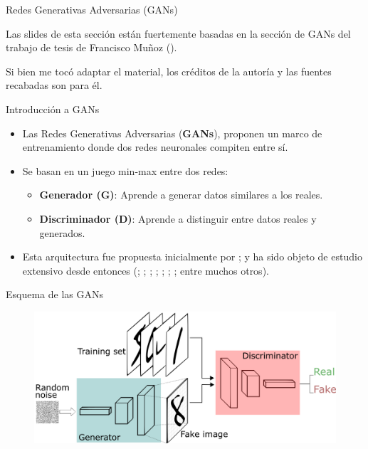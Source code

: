 \documentclass[aspectratio=169,xcolor=dvipsnames, t, spanish]{beamer}
\begin{document}

\begin{frame}{Redes Generativas Adversarias (GANs)}
    \begin{center}
        Las slides de esta sección están fuertemente basadas en la sección de GANs del trabajo de tesis de Francisco Muñoz (\cite{MunozLopez2024}).

        Si bien me tocó adaptar el material, los créditos de la autoría y las fuentes recabadas son para él.
    \end{center}
\end{frame}

\begin{frame}{Introducción a GANs}
    \begin{itemize}
        \item Las Redes Generativas Adversarias (\textbf{GANs}), proponen un marco de entrenamiento donde dos redes neuronales compiten entre sí.
        \pause
        \item Se basan en un juego min-max entre dos redes:
        \pause
        \begin{itemize}
            \item \textbf{Generador (G)}: Aprende a generar datos similares a los reales.
            \pause
            \item \textbf{Discriminador (D)}: Aprende a distinguir entre datos reales y generados.
        \end{itemize}
        \pause
        \item Esta arquitectura fue propuesta inicialmente por \citet{Goodfellow2014}; y ha sido objeto de estudio extensivo desde entonces (\citet{Arjovsky2017}; \citet{Gulrajani2017}; \citet{Heusel2017}; \citet{Salimans2016}; \citet{Zhu2017}; \citet{Wang2018}; \citet{Xiao2021}; entre muchos otros).
    \end{itemize}
\end{frame}

\begin{frame}{Esquema de las GANs}
    \begin{figure}
        \centering
        \includegraphics[width=0.9\linewidth]{figures/GANs.png}
        \label{fig:enter-label}
    \end{figure}
\end{frame}
\end{document}
